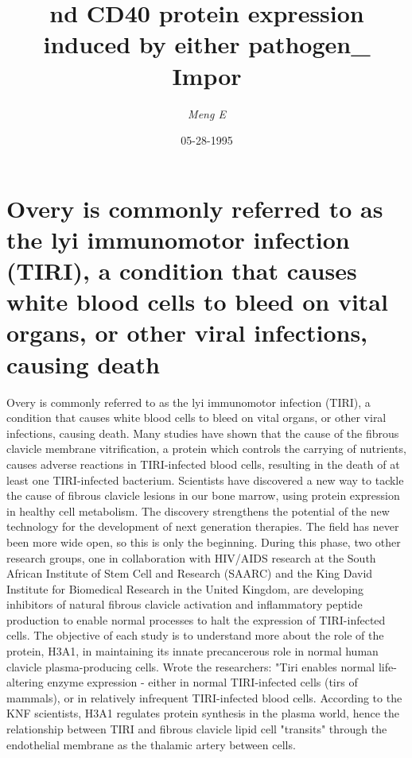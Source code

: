 \documentclass{article}%
\title{nd CD40 protein expression induced by either pathogen\_ Impor}%
\author{\textit{Meng E}}%
\date{05-28-1995}%
\begin{document}
%
\normalsize%
\maketitle%
\section{Overy is commonly referred to as the lyi immunomotor infection (TIRI), a condition that causes white blood cells to bleed on vital organs, or other viral infections, causing death}%
\label{sec:Overyiscommonlyreferredtoasthelyiimmunomotorinfection(TIRI),aconditionthatcauseswhitebloodcellstobleedonvitalorgans,orotherviralinfections,causingdeath}%
Overy is commonly referred to as the lyi immunomotor infection (TIRI), a condition that causes white blood cells to bleed on vital organs, or other viral infections, causing death. Many studies have shown that the cause of the fibrous clavicle membrane vitrification, a protein which controls the carrying of nutrients, causes adverse reactions in TIRI{-}infected blood cells, resulting in the death of at least one TIRI{-}infected bacterium.\newline%
Scientists have discovered a new way to tackle the cause of fibrous clavicle lesions in our bone marrow, using protein expression in healthy cell metabolism. The discovery strengthens the potential of the new technology for the development of next generation therapies.\newline%
The field has never been more wide open, so this is only the beginning. During this phase, two other research groups, one in collaboration with HIV/AIDS research at the South African Institute of Stem Cell and Research (SAARC) and the King David Institute for Biomedical Research in the United Kingdom, are developing inhibitors of natural fibrous clavicle activation and inflammatory peptide production to enable normal processes to halt the expression of TIRI{-}infected cells.\newline%
The objective of each study is to understand more about the role of the protein, H3A1, in maintaining its innate precancerous role in normal human clavicle plasma{-}producing cells. Wrote the researchers:\newline%
"Tiri enables normal life{-}altering enzyme expression {-} either in normal TIRI{-}infected cells (tirs of mammals), or in relatively infrequent TIRI{-}infected blood cells. According to the KNF scientists, H3A1 regulates protein synthesis in the plasma world, hence the relationship between TIRI and fibrous clavicle lipid cell "transits" through the endothelial membrane as the thalamic artery between cells.\newline%
\end{document}
